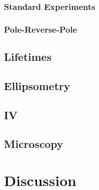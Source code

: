\subsubsection{Standard Experiments}
\subsubsection{Pole-Reverse-Pole}
\subsection{Lifetimes}
\subsection{Ellipsometry}
\subsection{\ir{}}
\subsection{IV}
\subsection{Microscopy}
\subsection{\dls{}}


\section{Discussion}